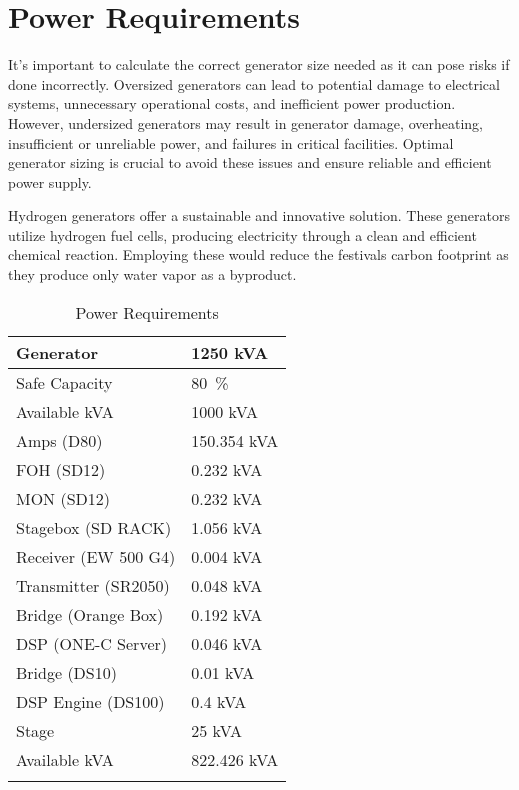 \section{Power Requirements}
    It's important to calculate the correct generator size needed as it can pose risks if done incorrectly. Oversized generators can lead to potential damage to electrical systems, unnecessary operational costs, and inefficient power production. However, undersized generators may result in generator damage, overheating, insufficient or unreliable power, and failures in critical facilities. Optimal generator sizing is crucial to avoid these issues and ensure reliable and efficient power supply.

    Hydrogen generators offer a sustainable and innovative solution. These generators utilize hydrogen fuel cells, producing electricity through a clean and efficient chemical reaction. Employing these would reduce the festivals carbon footprint as they produce only water vapor as a byproduct.

    \begin{longtable}[H]{|l|l|}
    \hline
    \rowcolor[HTML]{EFEFEF} 
    Generator            & 1250 kVA    \\ \hline
    \endfirsthead
    \endhead
    \rowcolor[HTML]{EFEFEF} 
    Safe Capacity        & \SI{80}{\percent}         \\ \hline
    \rowcolor[HTML]{EFEFEF} 
    Available kVA        & 1000 kVA    \\ \hline
    Amps (D80)           & 150.354 kVA \\ \hline
    FOH (SD12)           & 0.232 kVA   \\ \hline
    MON (SD12)           & 0.232 kVA   \\ \hline
    Stagebox (SD RACK)   & 1.056 kVA   \\ \hline
    Receiver (EW 500 G4) & 0.004 kVA   \\ \hline
    Transmitter (SR2050) & 0.048 kVA   \\ \hline
    Bridge (Orange Box)  & 0.192 kVA   \\ \hline
    DSP (ONE-C Server)   & 0.046 kVA   \\ \hline
    Bridge (DS10)        & 0.01 kVA    \\ \hline
    DSP Engine (DS100)   & 0.4 kVA     \\ \hline
    Stage                & 25 kVA      \\ \hline
    \rowcolor[HTML]{EFEFEF} 
    Available kVA        & 822.426 kVA \\ \hline
    \caption{Power Requirements}
    \label{tab:power_requirements}
    \end{longtable}
